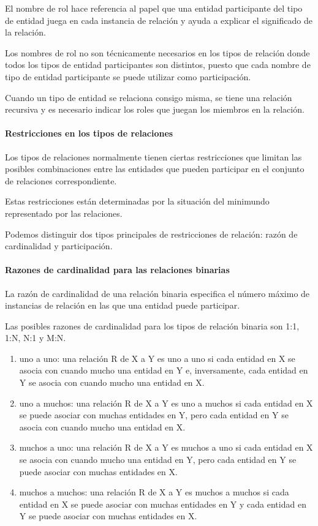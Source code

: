 El nombre de rol hace referencia al papel que una entidad participante del tipo de entidad juega en cada instancia de relación y ayuda a explicar el significado de la relación.


Los nombres de rol no son técnicamente necesarios en los tipos de relación donde todos los tipos de entidad participantes son distintos, puesto que cada nombre de tipo de entidad participante se puede utilizar como participación.

Cuando un tipo de entidad se relaciona consigo misma, se tiene una relación recursiva y es necesario indicar los roles que juegan los miembros en la relación.


\paragraph*{Restricciones en los tipos de relaciones}


Los tipos de relaciones normalmente tienen ciertas restricciones que limitan las posibles combinaciones entre las entidades que pueden participar en el conjunto de relaciones correspondiente.


Estas restricciones están determinadas por la situación del minimundo representado por las relaciones. 


Podemos distinguir dos tipos principales de restricciones de relación: razón de cardinalidad y participación.


\paragraph*{Razones de cardinalidad para las relaciones binarias}
La razón de cardinalidad de una relación binaria especifica el número máximo de instancias de relación en las que una entidad puede participar.


Las posibles razones de cardinalidad para los tipos de relación binaria son 1:1, 1:N, N:1 y M:N.
\begin{enumerate}
    \item uno a uno: una relación R de X a Y es uno a uno si cada entidad en X se asocia con cuando mucho una entidad en Y e, inversamente, cada entidad en Y se asocia con cuando mucho una entidad en X.
    \item uno a muchos: una relación R de X a Y es uno a muchos si cada entidad en X se puede asociar con muchas entidades en Y, pero cada entidad en Y se asocia con cuando mucho una entidad en X. 
    \item muchos a uno: una relación R de X a Y es muchos a uno si cada entidad en X se asocia con cuando mucho una entidad en Y, pero cada entidad en Y se puede asociar con muchas entidades en X. 
    \item muchos a muchos: una relación R de X a Y es muchos a muchos si cada entidad en X se puede asociar con muchas entidades en Y y cada entidad en Y se puede asociar con muchas entidades en X. 
\end{enumerate}


